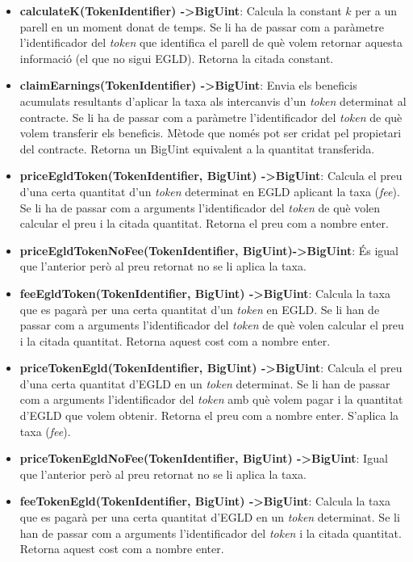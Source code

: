 \documentclass[11pt,a4paper]{article}
\begin{document}
\begin{itemize}
\item \textbf{calculateK(TokenIdentifier) -\textgreater BigUint}: Calcula la constant \(k\) per a un parell en un moment donat de temps. Se li ha de passar com a paràmetre l'identificador del \textit{token} que identifica el parell de què volem retornar aquesta informació (el que no sigui EGLD). Retorna la citada constant.
\item \textbf{claimEarnings(TokenIdentifier) -\textgreater BigUint}: Envia els beneficis acumulats resultants d'aplicar la taxa als intercanvis d'un \textit{token} determinat al contracte. Se li ha de passar com a paràmetre l'identificador del \textit{token} de què volem transferir els beneficis. Mètode que només pot ser cridat pel propietari del contracte. Retorna un BigUint equivalent a la quantitat transferida.
\item \textbf{priceEgldToken(TokenIdentifier, BigUint) -\textgreater BigUint}: Calcula el preu d'una certa quantitat d'un \textit{token} determinat en EGLD aplicant la taxa (\textit{fee}). Se li ha de passar com a arguments l'identificador del \textit{token} de què volen calcular el preu i la citada quantitat. Retorna el preu com a nombre enter.
\item \textbf{priceEgldTokenNoFee(TokenIdentifier, BigUint)-\textgreater BigUint}: És igual que l'anterior però al preu retornat no se li aplica la taxa.
\item \textbf{feeEgldToken(TokenIdentifier, BigUint) -\textgreater BigUint}:  Calcula la taxa que es pagarà per una certa quantitat d'un \textit{token} en EGLD. Se li han de passar com a arguments l'identificador del \textit{token} de què volen calcular el preu i la citada quantitat. Retorna aquest cost com a nombre enter.
\item \textbf{priceTokenEgld(TokenIdentifier, BigUint) -\textgreater BigUint}: Calcula el preu d'una certa quantitat d'EGLD en un \textit{token} determinat. Se li han de passar com a arguments l'identificador del \textit{token} amb què volem pagar i la quantitat d'EGLD que volem obtenir. Retorna el preu com a nombre enter. S'aplica la taxa (\textit{fee}).
\item \textbf{priceTokenEgldNoFee(TokenIdentifier, BigUint) -\textgreater BigUint}: Igual que l'anterior però al preu retornat no se li aplica la taxa.
\item \textbf{feeTokenEgld(TokenIdentifier, BigUint) -\textgreater BigUint}: Calcula la taxa que es pagarà per una certa quantitat d'EGLD en un \textit{token} determinat. Se li han de passar com a arguments l'identificador del \textit{token} i la citada quantitat. Retorna aquest cost com a nombre enter.

\end{itemize}
\end{document}
